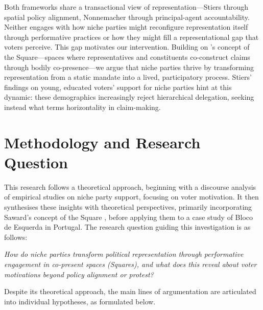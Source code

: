 Both frameworks share a transactional view of representation—Stiers through spatial policy alignment, Nonnemacher through principal-agent accountability. Neither engages with how niche parties might reconfigure representation itself through performative practices or how they might fill a representational gap that voters perceive. This gap motivates our intervention. Building on \textcite{saward2024}'s concept of the Square—spaces where representatives and constituents co-construct claims through bodily co-presence—we argue that niche parties thrive by transforming representation from a static mandate into a lived, participatory process. Stiers’ findings on young, educated voters’ support for niche parties \parencite[7]{stiers2024} hint at this dynamic: these demographics increasingly reject hierarchical delegation, seeking instead what \textcite{kim2024} terms horizontality in claim-making.

\section{Methodology and Research Question}\label{sec:Methodology and Research Question} %

This research follows a theoretical approach, beginning with a discourse
analysis of empirical studies on niche party support, focusing on voter motivation. It then synthesises these insights with theoretical perspectives, primarily incorporating Saward's concept of the Square \parencite[]{saward2024}, before applying them to a case study of Bloco de Esquerda in Portugal. The research question guiding this investigation is as follows:

\emph{How do niche parties transform political representation through performative engagement in co-present spaces (Squares), and what does this reveal about voter motivations beyond policy alignment or protest?}

Despite its theoretical approach, the main lines of argumentation are articulated
into individual hypotheses, as formulated below.

